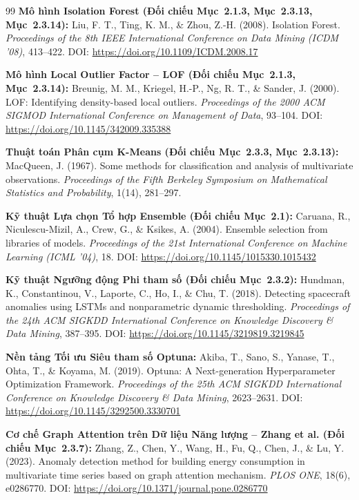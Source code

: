\begin{thebibliography}{99}
     \textbf{Mô hình Isolation Forest (Đối chiếu Mục~2.1.3, Mục~2.3.13, Mục~2.3.14):} Liu, F. T., Ting, K. M., \& Zhou, Z.-H. (2008). Isolation Forest. \textit{Proceedings of the 8th IEEE International Conference on Data Mining (ICDM '08)}, 413--422. DOI: \url{https://doi.org/10.1109/ICDM.2008.17}
    
     \textbf{Mô hình Local Outlier Factor -- LOF (Đối chiếu Mục~2.1.3, Mục~2.3.14):} Breunig, M. M., Kriegel, H.-P., Ng, R. T., \& Sander, J. (2000). LOF: Identifying density-based local outliers. \textit{Proceedings of the 2000 ACM SIGMOD International Conference on Management of Data}, 93--104. DOI: \url{https://doi.org/10.1145/342009.335388}
    
     \textbf{Thuật toán Phân cụm K-Means (Đối chiếu Mục~2.3.3, Mục~2.3.13):} MacQueen, J. (1967). Some methods for classification and analysis of multivariate observations. \textit{Proceedings of the Fifth Berkeley Symposium on Mathematical Statistics and Probability}, 1(14), 281--297.
    
     \textbf{Kỹ thuật Lựa chọn Tổ hợp Ensemble (Đối chiếu Mục~2.1):} Caruana, R., Niculescu-Mizil, A., Crew, G., \& Ksikes, A. (2004). Ensemble selection from libraries of models. \textit{Proceedings of the 21st International Conference on Machine Learning (ICML '04)}, 18. DOI: \url{https://doi.org/10.1145/1015330.1015432}
    
     \textbf{Kỹ thuật Ngưỡng động Phi tham số (Đối chiếu Mục~2.3.2):} Hundman, K., Constantinou, V., Laporte, C., Ho, I., \& Chu, T. (2018). Detecting spacecraft anomalies using LSTMs and nonparametric dynamic thresholding. \textit{Proceedings of the 24th ACM SIGKDD International Conference on Knowledge Discovery \& Data Mining}, 387--395. DOI: \url{https://doi.org/10.1145/3219819.3219845}
    
     \textbf{Nền tảng Tối ưu Siêu tham số Optuna:} Akiba, T., Sano, S., Yanase, T., Ohta, T., \& Koyama, M. (2019). Optuna: A Next-generation Hyperparameter Optimization Framework. \textit{Proceedings of the 25th ACM SIGKDD International Conference on Knowledge Discovery \& Data Mining}, 2623--2631. DOI: \url{https://doi.org/10.1145/3292500.3330701}

     \textbf{Cơ chế Graph Attention trên Dữ liệu Năng lượng -- Zhang et al. (Đối chiếu Mục~2.3.7):} Zhang, Z., Chen, Y., Wang, H., Fu, Q., Chen, J., \& Lu, Y. (2023). Anomaly detection method for building energy consumption in multivariate time series based on graph attention mechanism. \textit{PLOS ONE}, 18(6), e0286770. DOI: \url{https://doi.org/10.1371/journal.pone.0286770}
    

\end{thebibliography}

